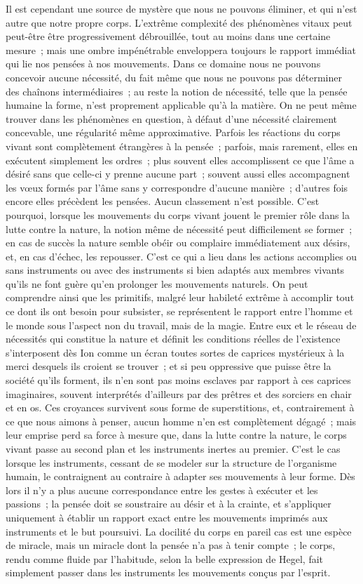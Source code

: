 \documentclass[french,twoside]{book} %
\begin{document}
Il est cependant une source de mystère que nous ne pouvons éliminer, et qui n'est autre que notre propre corps. L'extrême complexité des phénomènes vitaux peut peut-être être progressivement débrouillée, tout au moins dans une certaine mesure ; mais une ombre impénétrable enveloppera toujours le rapport immédiat qui lie nos pensées à nos mouvements. Dans ce domaine nous ne pouvons concevoir aucune nécessité, du fait même que nous ne pouvons pas déterminer des chaînons intermédiaires ; au reste la notion de nécessité, telle que la pensée humaine la forme, n'est proprement applicable qu'à la matière. On ne peut même trouver dans les phénomènes en question, à défaut d'une nécessité clairement concevable, une régularité même approximative. Parfois les réactions du corps vivant sont complètement étrangères à la pensée ; parfois, mais rarement, elles en exécutent simplement les ordres ; plus souvent elles accomplissent ce que l'âme a désiré sans que celle-ci y prenne aucune part ; souvent aussi elles accompagnent les vœux formés par l'âme sans y correspondre d'aucune manière ; d'autres fois encore elles précèdent les pensées. Aucun classement n'est possible. C'est pourquoi, lorsque les mouvements du corps vivant jouent le premier rôle dans la lutte contre la nature, la notion même de nécessité peut difficilement se former ; en cas de succès la nature semble obéir ou complaire immédiatement aux désirs, et, en cas d'échec, les repousser. C'est ce qui a lieu dans les actions accomplies ou sans instruments ou avec des instruments si bien adaptés aux membres vivants qu'ils ne font guère qu'en prolonger les mouvements naturels. On peut comprendre ainsi que les primitifs, malgré leur habileté extrême à accomplir tout ce dont ils ont besoin pour subsister, se représentent le rapport entre l'homme et le monde sous l'aspect non du travail, mais de la magie. Entre eux et le réseau de nécessités qui constitue la nature et définit les conditions réelles de l'existence s'interposent dès Ion comme un écran toutes sortes de caprices mystérieux à la merci desquels ils croient se trouver ; et si peu oppressive que puisse être la société qu’ils forment, ils n'en sont pas moins esclaves par rapport à ces caprices imaginaires, souvent interprétés d'ailleurs par des prêtres et des sorciers en chair et en os. Ces croyances survivent sous forme de superstitions, et, contrairement à ce que nous aimons à penser, aucun homme n'en est complètement dégagé ; mais leur emprise perd sa force à mesure que, dans la lutte contre la nature, le corps vivant passe au second plan et les instruments inertes au premier. C'est le cas lorsque les instruments, cessant de se modeler sur la structure de l'organisme humain, le contraignent au contraire à adapter ses mouvements à leur forme. Dès lors il n'y a plus aucune correspondance entre les gestes à exécuter et les passions ; la pensée doit se soustraire au désir et à la crainte, et s'appliquer uniquement à établir un rapport exact entre les mouvements imprimés aux instruments et le but poursuivi. La docilité du corps en pareil cas est une espèce de miracle, mais un miracle dont la pensée n'a pas à tenir compte ; le corps, rendu comme fluide par l'habitude, selon la belle expression de Hegel, fait simplement passer dans les instruments les mouvements conçus par l'esprit. 
\end{document}
